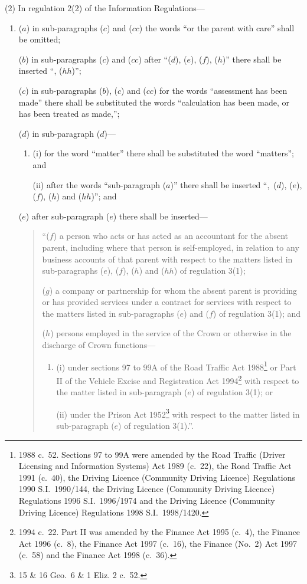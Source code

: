 \documentclass[12pt,a4paper]{article}
\begin{document}
(2) In regulation 2(2) of the Information Regulations—
\begin{enumerate}\item[]
($a$) in sub-paragraphs ($c$)  and ($cc$)  the words “or the parent with care” shall be omitted;

($b$) in sub-paragraphs ($c$)  and ($cc$)  after “($d$), ($e$), ($f$), ($h$)” there shall be inserted “, ($hh$)”;

($c$) in sub-paragraphs ($b$), ($c$)  and ($cc$)  for the words “assessment has been made” there shall be substituted the words “calculation has been made, or has been treated as made,”;

($d$) in sub-paragraph ($d$)—
\begin{enumerate}\item[]
(i) for the word “matter” there shall be substituted the word “matters”; and

(ii) after the words “sub-paragraph ($a$)” there shall be inserted “,~($d$), ($e$), ($f$), ($h$)  and ($hh$)”; and
\end{enumerate}

($e$) after sub-paragraph ($e$)  there shall be inserted—
\begin{quotation}
“($f$) a person who acts or has acted as an accountant for the absent parent, including where that person is self-employed, in relation to any business accounts of that parent with respect to the matters listed in sub-paragraphs ($e$), ($f$), ($h$)  and ($hh$)  of regulation 3(1);

($g$) a company or partnership for whom the absent parent is providing or has provided services under a contract for services with respect to the matters listed in sub-paragraphs ($e$)  and ($f$)  of regulation 3(1); and

($h$) persons employed in the service of the Crown or otherwise in the discharge of Crown functions—
\begin{enumerate}\item[]
(i) under sections 97 to 99A of the Road Traffic Act 1988\footnote{1988 c.\ 52. Sections 97 to 99A were amended by the Road Traffic (Driver Licensing and Information Systems) Act 1989 (c.\ 22), the Road Traffic Act 1991 (c.\ 40), the Driving Licence (Community Driving Licence) Regulations 1990 S.I.\ 1990/144, the Driving Licence (Community Driving Licence) Regulations 1996 S.I.\ 1996/1974 and the Driving Licence (Community Driving Licence) Regulations 1998 S.I.\ 1998/1420.} or Part II of the Vehicle Excise and Registration Act 1994\footnote{1994 c.\ 22. Part II was amended by the Finance Act 1995 (c.\ 4), the Finance Act 1996 (c.\ 8), the Finance Act 1997 (c.\ 16), the Finance (No.\ 2) Act 1997 (c.\ 58) and the Finance Act 1998 (c.\ 36).} with respect to the matter listed in sub-paragraph ($e$)  of regulation 3(1); or

(ii) under the Prison Act 1952\footnote{15 \& 16 Geo.\ 6 \& 1 Eliz. 2 c.\ 52.} with respect to the matter listed in sub-paragraph ($e$)  of regulation 3(1).”.
\end{enumerate}
\end{quotation}
\end{enumerate}
\end{document}
